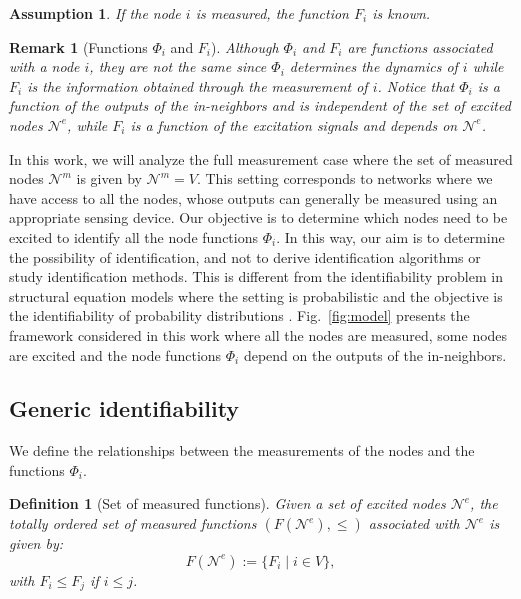 \documentclass[letterpaper,10pt,journal]{IEEEtran}
\newtheorem{definition}{Definition}
\newtheorem{assumption}{Assumption}
\newtheorem{remark}{Remark}
\newcommand{\NN}{\mathcal{N}}
\begin{document}
\begin{assumption}\label{ass:function_Fi}
    If the node $i$ is measured, the function $F_i$ is known.
\end{assumption}


\begin{remark}[Functions $\Phi_i$ and $F_i$]
Although $\Phi_i$ and $F_i$ are functions associated with a node $i$, they are not the same since $\Phi_i$ determines the dynamics of $i$ while $F_i$ is the information obtained through the measurement of $i$. Notice that $\Phi_i$ is a function of the outputs of the in-neighbors and  is independent of the set of excited nodes $\NN^e$, while $F_i$ is a function of the excitation signals and depends on $\NN^e$.
\end{remark}

In this work, we will analyze the full measurement case where the set of measured nodes $\NN^m$ is given by $\NN^m=V$. This setting corresponds to networks where we have access to all the nodes, whose outputs can generally be measured using an appropriate sensing device. Our objective is to determine which nodes need to be excited to identify all the node functions $\Phi_i$. In this way, our aim is to determine the possibility of identification, and not to derive identification algorithms or study identification methods. This is different from the identifiability problem in structural equation models where the setting is probabilistic and the objective is the identifiability of probability distributions \cite{jordan2004graphical}. Fig.~\ref{fig:model} presents the framework considered in this work where all the nodes are measured, some nodes are excited and the node functions $\Phi_i$ depend on the outputs of the in-neighbors.



\subsection{Generic identifiability}\label{subsec:generic_ident}


We define the relationships between the measurements of the nodes and the functions $\Phi_i$.


\begin{definition}[Set of measured functions]\label{def:set_measured_functions}
    Given a set of excited nodes $\NN^e$, the totally ordered set of measured functions $(F(\mathcal{N}^e),\leq)$ associated with $\mathcal{N}^e$ is given by:
    $$
    F(\mathcal{N}^e):=\{F_i\;|\;i\in V\},
    $$
    with $F_i\leq F_j$ if $i\leq j$.
\end{definition}
\end{document}
